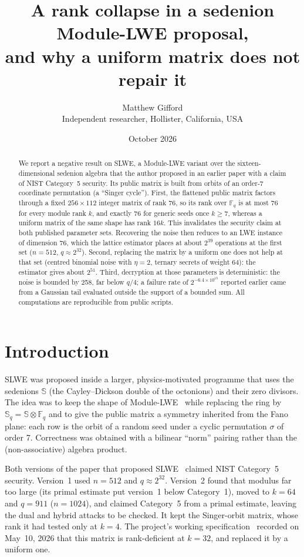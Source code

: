 \documentclass[11pt]{article}
\title{A rank collapse in a sedenion Module-LWE proposal,\\ and why a uniform matrix does not repair it}
\author{Matthew Gifford\\ \small Independent researcher, Hollister, California, USA}
\date{\small October 2026}
\theoremstyle{remark}
\newcommand{\F}{\mathbb{F}}
\newcommand{\Sed}{\mathbb{S}}
\begin{document}
\maketitle

\begin{abstract}
We report a negative result on SLWE, a Module-LWE variant over the sixteen-dimensional sedenion algebra that the
author proposed in an earlier paper with a claim of NIST Category~5 security. Its public matrix is built from orbits of an order-7 coordinate permutation (a
``Singer cycle''). First, the flattened public matrix factors through a fixed $256\times112$ integer matrix of rank 76,
so its rank over $\F_q$ is at most 76 for every module rank $k$, and exactly 76 for generic seeds once $k\ge 7$, whereas a
uniform matrix of the same shape has rank $16k$. This invalidates the security claim at both published parameter sets.
Recovering the noise then reduces to an LWE instance of dimension 76, which the lattice estimator places at about
$2^{39}$ operations at the first set ($n=512$, $q\approx2^{32}$). Second, replacing the matrix by a uniform one does not
help at that set (centred binomial noise with $\eta=2$, ternary secrets of weight 64): the estimator gives about
$2^{51}$. Third, decryption at those parameters is deterministic: the noise is
bounded by 258, far below $q/4$; a failure rate of $2^{-6.4\times10^{15}}$ reported earlier came from a Gaussian tail
evaluated outside the support of a bounded sum. All computations are reproducible from public scripts.
\end{abstract}

\section{Introduction}

SLWE was proposed inside a larger, physics-motivated programme that uses the sedenions $\Sed$ (the Cayley--Dickson
double of the octonions) and their zero divisors. The idea was to keep the shape of Module-LWE~\cite{Regev,LS15} while replacing the ring by
$\Sed_q=\Sed\otimes\F_q$ and to give the public matrix a symmetry inherited from the Fano plane: each row is the orbit of
a random seed under a cyclic permutation $\sigma$ of order 7. Correctness was obtained with a bilinear ``norm'' pairing
rather than the (non-associative) algebra product.

Both versions of the paper that proposed SLWE~\cite{Gif26a} claimed NIST Category~5 security. Version~1 used $n=512$
and $q\approx2^{32}$. Version~2 found that modulus far too large (its primal estimate put version~1 below Category~1),
moved to $k=64$ and $q=911$ ($n=1024$), and claimed Category~5 from a primal estimate, leaving the dual and hybrid
attacks to be checked. It kept the Singer-orbit matrix, whose rank it had tested only at $k=4$. The project's working
specification~\cite{Gif26b} recorded on May~10, 2026 that this matrix is rank-deficient at $k=32$, and replaced it by a
uniform one.
\end{document}
